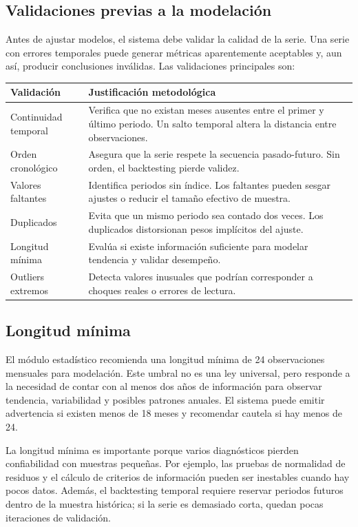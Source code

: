 \subsection{Validaciones previas a la modelación}

Antes de ajustar modelos, el sistema debe validar la calidad de la serie. Una serie con errores temporales puede generar métricas aparentemente aceptables y, aun así, producir conclusiones inválidas. Las validaciones principales son:

\begin{longtable}{p{}p{}}
\toprule
\textbf{Validación} & \textbf{Justificación metodológica} \\
\midrule
\endhead
Continuidad temporal & Verifica que no existan meses ausentes entre el primer y último periodo. Un salto temporal altera la distancia entre observaciones. \\
Orden cronológico & Asegura que la serie respete la secuencia pasado-futuro. Sin orden, el backtesting pierde validez. \\
Valores faltantes & Identifica periodos sin índice. Los faltantes pueden sesgar ajustes o reducir el tamaño efectivo de muestra. \\
Duplicados & Evita que un mismo periodo sea contado dos veces. Los duplicados distorsionan pesos implícitos del ajuste. \\
Longitud mínima & Evalúa si existe información suficiente para modelar tendencia y validar desempeño. \\
Outliers extremos & Detecta valores inusuales que podrían corresponder a choques reales o errores de lectura. \\
\bottomrule
\end{longtable}

\subsection{Longitud mínima}

El módulo estadístico recomienda una longitud mínima de 24 observaciones mensuales para modelación. Este umbral no es una ley universal, pero responde a la necesidad de contar con al menos dos años de información para observar tendencia, variabilidad y posibles patrones anuales. El sistema puede emitir advertencia si existen menos de 18 meses y recomendar cautela si hay menos de 24.

La longitud mínima es importante porque varios diagnósticos pierden confiabilidad con muestras pequeñas. Por ejemplo, las pruebas de normalidad de residuos y el cálculo de criterios de información pueden ser inestables cuando hay pocos datos. Además, el backtesting temporal requiere reservar periodos futuros dentro de la muestra histórica; si la serie es demasiado corta, quedan pocas iteraciones de validación.

